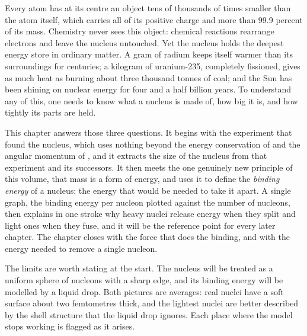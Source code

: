 

Every atom has at its centre an object tens of thousands of times smaller than the atom itself, which
carries all of its positive charge and more than \num{99.9} percent of its mass. Chemistry never sees this
object: chemical reactions rearrange electrons and leave the nucleus untouched. Yet the nucleus holds
the deepest energy store in ordinary matter. A gram of radium keeps itself warmer than its
surroundings for centuries; a kilogram of uranium-235, completely fissioned, gives as much heat as
burning about three thousand tonnes of coal; and the Sun has been
shining on nuclear energy for four and a half billion years. To understand any of this, one needs to know
what a nucleus is made of, how big it is, and how tightly its parts are held.

This chapter answers those three questions. It begins with the experiment that found the nucleus,
which uses nothing beyond the energy conservation of  and the angular momentum of
, and it extracts the size of the nucleus from that experiment and its successors.
It then meets the one genuinely new principle of this volume, that mass is a form of energy, and
uses it to define the \emph{binding energy} of a nucleus: the energy that would be needed to take it
apart. A single graph, the binding energy per nucleon plotted against the number of nucleons, then
explains in one stroke why heavy nuclei release energy when they split and light ones when they fuse,
and it will be the reference point for every later chapter. The chapter closes with the force that
does the binding, and with the energy needed to remove a single nucleon.

The limits are worth stating at the start. The nucleus will be treated as a uniform sphere of
nucleons with a sharp edge, and its binding energy will be modelled by a liquid drop. Both pictures
are averages: real nuclei have a soft surface about two femtometres thick, and the lightest nuclei
are better described by the shell structure that the liquid drop ignores. Each place where the model
stops working is flagged as it arises.

